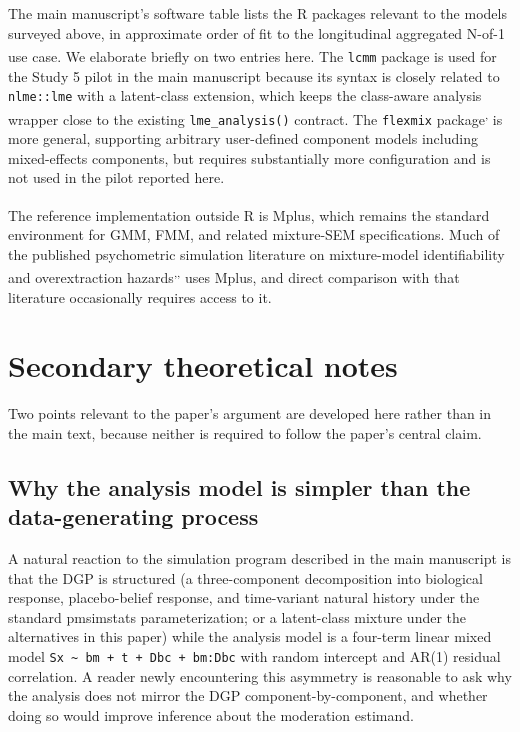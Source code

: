 \documentclass[
  11pt,
]{article}
\begin{document}
The main manuscript's software table lists the R packages relevant to
the models surveyed above, in approximate order of fit to the
longitudinal aggregated N-of-1 use case. We elaborate briefly on two
entries here. The \texttt{lcmm} package\textsuperscript{} is used for the
Study 5 pilot in the main manuscript because its syntax is closely
related to \texttt{nlme::lme} with a latent-class extension, which keeps the
class-aware analysis wrapper close to the existing \texttt{lme\_analysis()}
contract. The \texttt{flexmix} package\textsuperscript{,} is more
general, supporting arbitrary user-defined component models including
mixed-effects components, but requires substantially more
configuration and is not used in the pilot reported here.

The reference implementation outside R is Mplus\textsuperscript{}, which
remains the standard environment for GMM, FMM, and related
mixture-SEM specifications. Much of the published psychometric
simulation literature on mixture-model identifiability and
overextraction hazards\textsuperscript{,,} uses Mplus, and direct comparison with that literature
occasionally requires access to it.

\section{Secondary theoretical notes}\label{secondary-theoretical-notes}

Two points relevant to the paper's argument are developed here rather
than in the main text, because neither is required to follow the
paper's central claim.

\subsection{Why the analysis model is simpler than the data-generating process}\label{why-the-analysis-model-is-simpler-than-the-data-generating-process}

A natural reaction to the simulation program described in the main
manuscript is that the DGP is structured (a three-component
decomposition into biological response, placebo-belief response, and
time-variant natural history under the standard pmsimstats
parameterization; or a latent-class mixture under the alternatives in
this paper) while the analysis model is a four-term linear mixed model
\texttt{Sx \textasciitilde{} bm + t + Dbc + bm:Dbc} with random
intercept and AR(1) residual correlation. A reader newly encountering
this asymmetry is reasonable to ask why the analysis does not mirror
the DGP component-by-component, and whether doing so would improve
inference about the moderation estimand.
\end{document}
